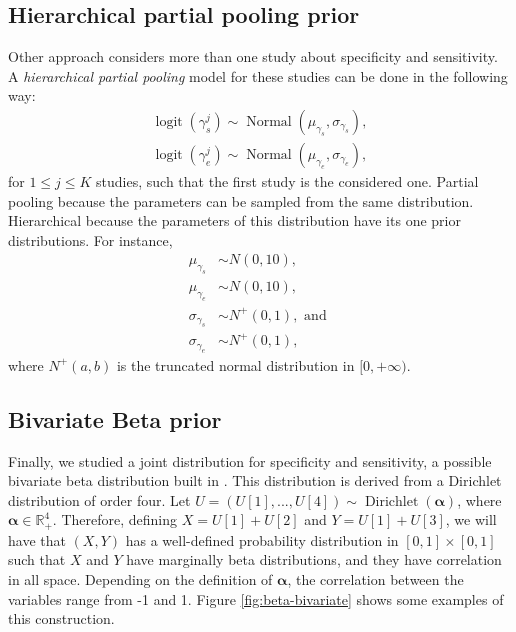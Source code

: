 \subsection{Hierarchical partial pooling prior}

Other approach considers more than one study about specificity and
sensitivity. A {\em hierarchical partial pooling} model for these studies
can be done in the following way: 
\begin{gather*}
    \operatorname{logit}(\gamma_s^j) \sim \operatorname{Normal}(\mu_{\gamma_s}, \sigma_{\gamma_s}), \\
    \operatorname{logit}(\gamma_e^j) \sim \operatorname{Normal}(\mu_{\gamma_e}, \sigma_{\gamma_e}), 
\end{gather*}
for $1 \le j \le K$ studies, such that the first study is the considered one.
Partial pooling because the parameters can be sampled from the same
distribution. Hierarchical because the parameters of this distribution have
its one prior distributions. For instance, 
\begin{align*}
    \mu_{\gamma_s} &\sim N(0, 10), \\ 
    \mu_{\gamma_e} &\sim N(0, 10), \\
    \sigma_{\gamma_s} &\sim N^+(0,1), \text{ and } \\
    \sigma_{\gamma_e} &\sim N^+(0,1),
\end{align*}
where $N^+(a,b)$ is the truncated normal distribution in $[0,+\infty)$.

\subsection{Bivariate Beta prior}

Finally, we studied a joint distribution for specificity and sensitivity, a
possible bivariate beta distribution built in \cite{olkin2015constructions}.
This distribution is derived from a Dirichlet distribution of order four. Let $U = (U[1],...,U[4]) \sim \operatorname{Dirichlet}(\boldsymbol{\alpha})$, where
$\boldsymbol{\alpha} \in \mathbb{R}^4_+$. Therefore, defining $X = U[1] +
U[2]$ and $Y = U[1] + U[3]$, we will have that $(X,Y)$ has a well-defined
probability distribution in
$[0,1] \times [0,1]$ such that $X$ and $Y$ have marginally beta distributions,
and they have correlation in all space. Depending on the definition of
$\boldsymbol{\alpha}$, the correlation between the variables range from -1 and
1. Figure \ref{fig:beta-bivariate} shows some examples of this construction. 

